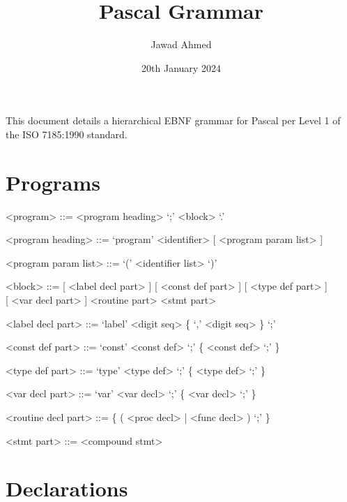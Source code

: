 \documentclass{article}
\title{Pascal Grammar}
\author{Jawad Ahmed}
\date{20th January 2024}
\begin{document}
\maketitle
\setcounter{section}{-1}

This document details a hierarchical EBNF grammar for Pascal per Level 1 of the ISO 7185:1990 standard.

\section{Programs}

{
  \begin{grammar}
    <program> ::= <program heading> `;' <block> `.'

    <program heading> ::= `program' <identifier> [ <program param list> ]

    <program param list> ::= `(' <identifier list> `)'
    
    <block> ::= [ <label decl part> ]  [ <const def part> ] [ <type def part> ] \\
    \hphantom{} [ <var decl part> ] <routine part> <stmt part>

    <label decl part> ::= `label' <digit seq> \{ `,' <digit seq> \} `;'

    <const def part> ::= `const' <const def> `;' \{ <const def> `;' \}

    <type def part> ::= `type' <type def> `;' \{ <type def> `;' \}

    <var decl part> ::= `var' <var decl> `;' \{ <var decl> `;' \}

    <routine decl part> ::= \{ ( <proc decl> | <func decl> ) `;' \}

    <stmt part> ::= <compound stmt>
  \end{grammar}
}

\section{Declarations}
\end{document}
